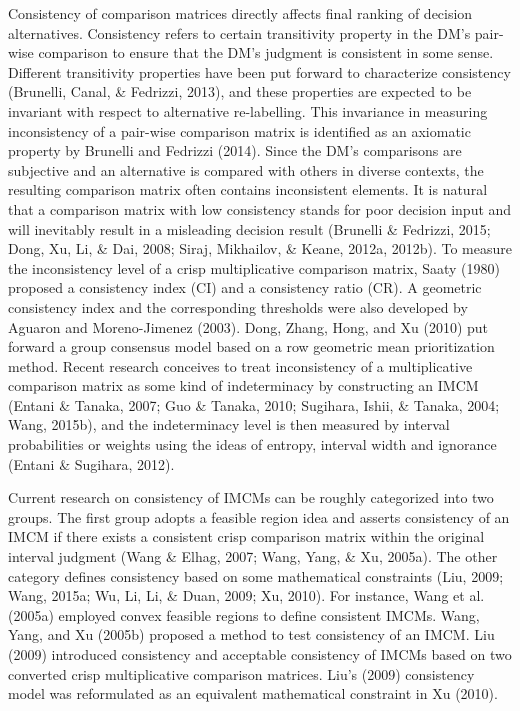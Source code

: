 \documentclass[10pt]{article}
\begin{document}
Consistency of comparison matrices directly affects final ranking of decision alternatives. Consistency refers to certain transitivity property in the DM's pair-wise comparison to ensure that the DM's judgment is consistent in some sense. Different transitivity properties have been put forward to characterize consistency (Brunelli, Canal, \& Fedrizzi, 2013), and these properties are expected to be invariant with respect to alternative re-labelling. This invariance in measuring inconsistency of a pair-wise comparison matrix is identified as an axiomatic property by Brunelli and Fedrizzi (2014). Since the DM's comparisons are subjective and an alternative is compared with others in diverse contexts, the resulting comparison matrix often contains inconsistent elements. It is natural that a comparison matrix with low consistency stands for poor decision input and will inevitably result in a misleading decision result (Brunelli \& Fedrizzi, 2015; Dong, Xu, Li, \& Dai, 2008; Siraj, Mikhailov, \& Keane, 2012a, 2012b). To measure the inconsistency level of a crisp multiplicative comparison matrix, Saaty (1980) proposed a consistency index (CI) and a consistency ratio (CR). A geometric consistency index and
the corresponding thresholds were also developed by Aguaron and Moreno-Jimenez (2003). Dong, Zhang, Hong, and Xu (2010) put forward a group consensus model based on a row geometric mean prioritization method. Recent research conceives to treat inconsistency of a multiplicative comparison matrix as some kind of indeterminacy by constructing an IMCM (Entani \& Tanaka, 2007; Guo \& Tanaka, 2010; Sugihara, Ishii, \& Tanaka, 2004; Wang, 2015b), and the indeterminacy level is then measured by interval probabilities or weights using the ideas of entropy, interval width and ignorance (Entani \& Sugihara, 2012).

Current research on consistency of IMCMs can be roughly categorized into two groups. The first group adopts a feasible region idea and asserts consistency of an IMCM if there exists a consistent crisp comparison matrix within the original interval judgment (Wang \& Elhag, 2007; Wang, Yang, \& Xu, 2005a). The other category defines consistency based on some mathematical constraints (Liu, 2009; Wang, 2015a; Wu, Li, Li, \& Duan, 2009; Xu, 2010). For instance, Wang et al. (2005a) employed convex feasible regions to define consistent IMCMs. Wang, Yang, and Xu (2005b) proposed a method to test consistency of an IMCM. Liu (2009) introduced consistency and acceptable consistency of IMCMs based on two converted crisp multiplicative comparison matrices. Liu's (2009) consistency model was reformulated as an equivalent mathematical constraint in $\mathrm{Xu}$ (2010).
\end{document}
